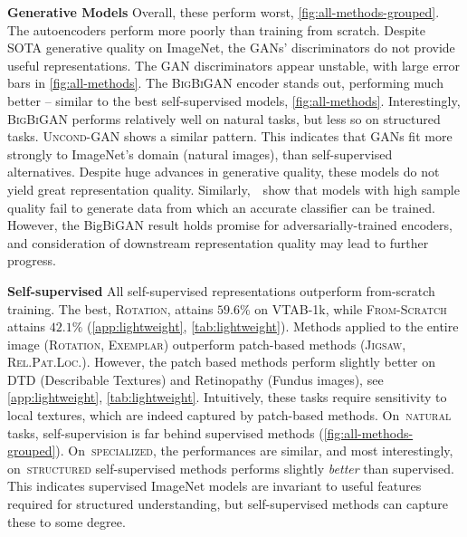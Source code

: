 \documentclass{article}
\newcommand{\myparagraph}[1]{\noindent\textbf{#1}\quad}
\DeclareRobustCommand{\taskNatural}{\raisebox{0.5pt}{\tikz{\fill[natural] (0cm,0cm) circle (.5ex);}}\,\textsc{natural}}
\DeclareRobustCommand{\taskSpecialized}{\raisebox{0.5pt}{\tikz{\fill[specialized] (0,0) circle (.5ex);}}\,\textsc{specialized}}
\DeclareRobustCommand{\taskStructured}{\raisebox{0.5pt}{\tikz{\fill[structured] (0,0) circle (.5ex);}}\,\textsc{structured}}
\newcommand{\imagenet}{ImageNet}
\begin{document}
\myparagraph{Generative Models}
Overall, these perform worst, \cref{fig:all-methods-grouped}.
The autoencoders perform more poorly than training from scratch.
Despite SOTA generative quality on \imagenet{}, the GANs' discriminators do not provide useful representations.
The GAN discriminators appear unstable, with large error bars in \cref{fig:all-methods}.
The \textsc{BigBiGAN} encoder stands out, performing much better -- similar to the best self-supervised models, \cref{fig:all-methods}.
Interestingly, \textsc{BigBiGAN} performs relatively well on natural tasks, but less so on structured tasks.
\textsc{Uncond-GAN} shows a similar pattern.
This indicates that GANs fit more strongly to \imagenet's domain (natural images), than self-supervised alternatives.
Despite huge advances in generative quality, these models do not yield great representation quality.
Similarly,~\citet{ravuri2019classification}~show that models with high sample quality fail to generate data from which an accurate classifier can be trained.
However, the BigBiGAN result holds promise for adversarially-trained encoders, and consideration of downstream representation quality may lead to further progress.

\myparagraph{Self-supervised}
All self-supervised representations outperform from-scratch training.
The best, \textsc{Rotation}, attains $59.6\%$ on VTAB-1k, while \textsc{From-Scratch} attains $42.1\%$ (\cref{app:lightweight}, \cref{tab:lightweight}).
Methods applied to the entire image (\textsc{Rotation}, \textsc{Exemplar}) outperform patch-based methods (\textsc{Jigsaw}, \textsc{Rel.Pat.Loc.}).
However, the patch based methods perform slightly better on DTD (Describable Textures) and Retinopathy (Fundus images), see \cref{app:lightweight}, \cref{tab:lightweight}.
Intuitively, these tasks require sensitivity to local textures, which are indeed captured by patch-based methods.
On \taskNatural{} tasks, self-supervision is far behind supervised methods (\cref{fig:all-methods-grouped}).
On \taskSpecialized{}, the performances are similar, and most interestingly, on \taskStructured{} self-supervised methods performs slightly \emph{better} than supervised.
This indicates supervised \imagenet{} models are invariant to useful features required for structured understanding, but self-supervised methods can capture these to some degree.
\end{document}
